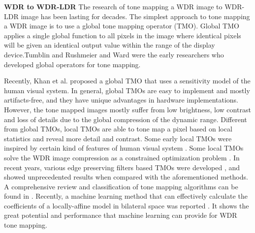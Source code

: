 \documentclass[journal]{IEEEtran}
\begin{document}
\textbf{WDR to WDR-LDR} 
The research of tone mapping a WDR image to WDR-LDR image has been lasting for decades. The simplest approach to tone mapping a WDR image is to use a global tone mapping operator (TMO). Global TMO applies a single global function to all pixels in the image where identical pixels will be given an identical output value within the range of the display device.Tumblin and Rushmeier \cite{tumblin1993tone} and Ward \cite{ward1994contrast} were the early researchers who developed global operators
for tone mapping. 

Recently, Khan et al. \cite{khan2018tone} proposed a global TMO that uses a sensitivity model of the human visual system. In general, global TMOs are easy to implement and mostly artifacts-free, and they have unique advantages in hardware implementations. However, the tone mapped images mostly suffer from low brightness, low contrast and loss of details
due to the global compression of the dynamic range. Different from global TMOs, local TMOs are able to tone map a pixel based on local statistics and reveal more detail and contrast. Some early local TMOs were inspired by certain kind of features of human visual system \cite{reinhard2005dynamic,van2006encoding,spitzer2003biological}. Some local TMOs solve the WDR image compression as a constrained optimization problem \cite{mantiuk2008display,ma2014high}. 
In recent years, various edge preserving filters based TMOs were developed \cite{durand2002fast,farbman2008edge,gu2013local,paris2015local}, and showed unprecedented results when compared with the aforementioned methods. A comprehensive review and classification of tone mapping algorithms can be found in \cite{eilertsen2017comparative}. Recently, a machine learning method that can effectively calculate the coefficients of a locally-affine model in bilateral space was reported \cite{gharbi2017deep}. It shows the great potential and performance that machine learning can provide for WDR tone mapping. 

\end{document}

